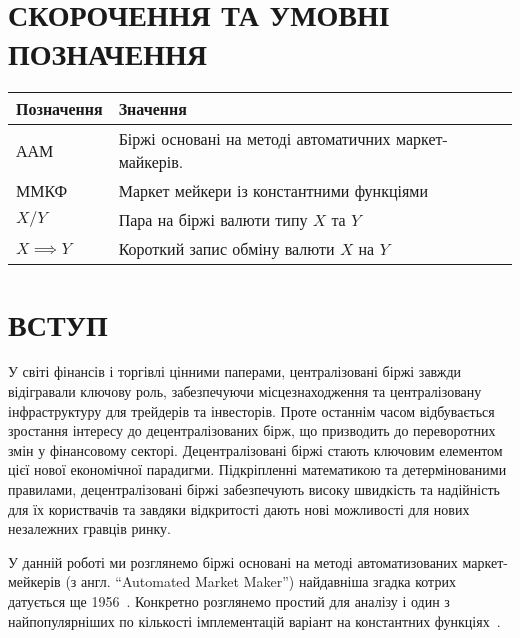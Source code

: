 \documentclass[14pt]{extarticle}
\begin{document}
\newpage

\renewcommand{\contentsname}{ЗМІСТ}
\setcounter{tocdepth}{2}
\tableofcontents
\newpage

\section*{СКОРОЧЕННЯ ТА УМОВНІ ПОЗНАЧЕННЯ}\label{sec:notation}

\begin{center}
	\begin{tabular}{ll}
		Позначення       & Значення                                               \\[0pt]
		\hline{}
		ААМ              & Біржі основані на методі автоматичних маркет-майкерів. \\[0pt]
		ММКФ             & Маркет мейкери із константними функціями               \\[0pt]
		\(X/Y\)          & Пара на біржі валюти типу \(X\) та \(Y\)               \\[0pt]
		\(X \implies Y\) & Короткий запис обміну валюти \(X\) на \(Y\)            \\[0pt]
	\end{tabular}
\end{center}

\newpage

\section{ВСТУП}\label{sec:intro}

У світі фінансів і торгівлі цінними паперами, централізовані біржі завжди
відігравали ключову роль, забезпечуючи місцезнаходження та централізовану
інфраструктуру для трейдерів та інвесторів. Проте останнім часом відбувається
зростання інтересу до децентралізованих бірж, що призводить до переворотних змін
у фінансовому секторі. Децентралізовані біржі стають ключовим елементом цієї
нової економічної парадигми. Підкріпленні математикою та детермінованими
правилами, децентралізовані біржі забезпечують високу швидкість та надійність
для їх користвачів та завдяки відкритості дають нові можливості для нових
незалежних гравців ринку.

У данній роботі ми розглянемо біржі основані на методі автоматизованих
маркет-мейкерів (з англ. ``Automated Market Maker'') найдавніша згадка котрих
датується ще 1956~\cite{mccarthy}. Конкретно розглянемо простий для аналізу і
один з найпопулярніших по кількості імплементацій варіант на константних
функціях~\cite{angeris_2023}.
\end{document}
